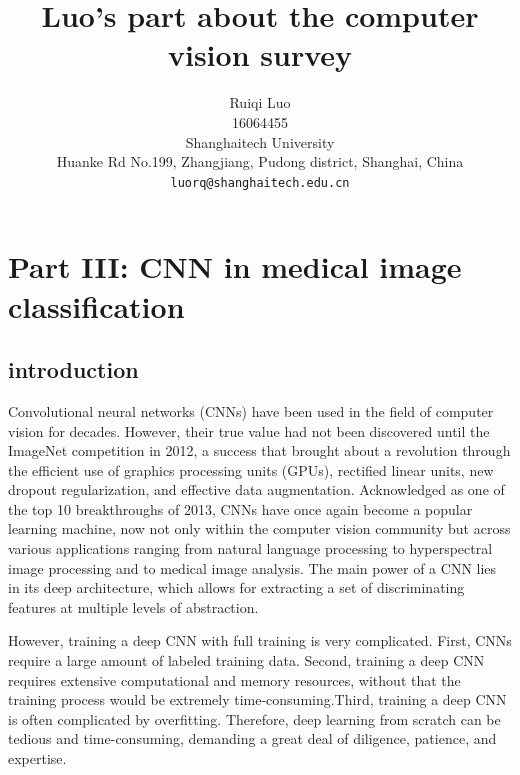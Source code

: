 \documentclass[10pt,twocolumn,letterpaper]{article}
\begin{document}
\title{Luo's part about the computer vision survey}
\author{Ruiqi Luo\\
		16064455\\
		Shanghaitech University\\
		Huanke Rd No.199, Zhangjiang, Pudong district, Shanghai, China\\
		{\tt\small luorq@shanghaitech.edu.cn}
}

\maketitle

\section{Part III: CNN in medical image classification}

\subsection{introduction}

Convolutional neural networks (CNNs) have been used in the field of computer vision for decades. However, their true value had not been discovered until the ImageNet competition in 2012, a success that brought about a revolution through the efficient use of graphics processing units (GPUs), rectified linear units, new dropout regularization, and effective data augmentation. Acknowledged as one of the top 10 breakthroughs of 2013, CNNs have once again become a popular learning machine, now not only within the computer vision community but across various applications ranging from natural language processing to hyperspectral image processing and to medical image analysis. The main power of a CNN lies in its deep architecture, which allows for extracting a set of discriminating features at multiple levels of abstraction\cite{tajbakhsh2016convolutional}. 

However, training a deep CNN with full training is very complicated. First, CNNs require a large
amount of labeled training data. Second, training a deep CNN requires extensive computational and memory resources, without that the training process would be extremely time-consuming.Third, training a deep CNN is often complicated by overfitting. Therefore, deep learning from scratch can be tedious and time-consuming, demanding a great deal of diligence, patience, and expertise.
\end{document}
